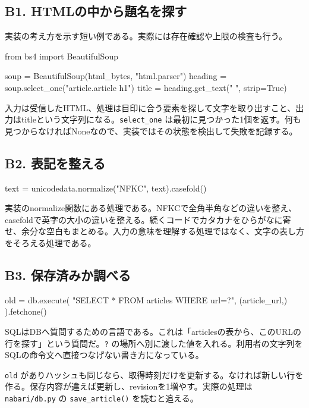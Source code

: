\documentclass[a4paper,10pt]{ltjsarticle}
\begin{document}
\subsection*{B1. HTMLの中から題名を探す}

実装の考え方を示す短い例である。実際には存在確認や上限の検査も行う。


\begin{Code}
from bs4 import BeautifulSoup

soup = BeautifulSoup(html_bytes, "html.parser")
heading = soup.select_one("article.article h1")
title = heading.get_text(" ", strip=True)
\end{Code}

入力は受信したHTML、処理は目印に合う要素を探して文字を取り出すこと、出力はtitleという文字列になる。\nolinkurl{select_one} は最初に見つかった1個を返す。何も見つからなければNoneなので、実装ではその状態を検出して失敗を記録する。


\subsection*{B2. 表記を整える}

\begin{Code}
text = unicodedata.normalize("NFKC", text).casefold()
\end{Code}

実装のnormalize関数にある処理である。NFKCで全角半角などの違いを整え、casefoldで英字の大小の違いを整える。続くコードでカタカナをひらがなに寄せ、余分な空白もまとめる。入力の意味を理解する処理ではなく、文字の表し方をそろえる処理である。


\subsection*{B3. 保存済みか調べる}

\begin{Code}
old = db.execute(
    "SELECT * FROM articles WHERE url=?",
    (article_url,)
).fetchone()
\end{Code}

SQLはDBへ質問するための言語である。これは「articlesの表から、このURLの行を探す」という質問だ。\nolinkurl{?} の場所へ別に渡した値を入れる。利用者の文字列をSQLの命令文へ直接つなげない書き方になっている。


\nolinkurl{old} がありハッシュも同じなら、取得時刻だけを更新する。なければ新しい行を作る。保存内容が違えば更新し、revisionを1増やす。実際の処理は \nolinkurl{nabari/db.py} の \nolinkurl{save_article()} を読むと追える。
\end{document}
